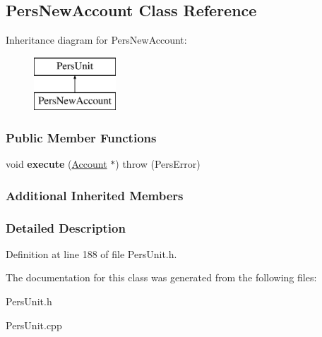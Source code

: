 \hypertarget{classPersNewAccount}{\subsection{Pers\-New\-Account Class Reference}
\label{dc/d6d/classPersNewAccount}
}
Inheritance diagram for Pers\-New\-Account\-:\begin{figure}[H]
\begin{center}
\leavevmode
\includegraphics[height=2.000000cm]{dc/d6d/classPersNewAccount}
\end{center}
\end{figure}
\subsubsection*{Public Member Functions}
\begin{DoxyCompactItemize}
\item 
\hypertarget{classPersNewAccount_a87856dc414f6f409b86a9f6120f6e2f1}{void {\bfseries execute} (\hyperlink{classAccount}{Account} $\ast$)  throw (\-Pers\-Error)}\label{dc/d6d/classPersNewAccount_a87856dc414f6f409b86a9f6120f6e2f1}

\end{DoxyCompactItemize}
\subsubsection*{Additional Inherited Members}


\subsubsection{Detailed Description}


Definition at line 188 of file Pers\-Unit.\-h.



The documentation for this class was generated from the following files\-:\begin{DoxyCompactItemize}
\item 
Pers\-Unit.\-h\item 
Pers\-Unit.\-cpp\end{DoxyCompactItemize}
